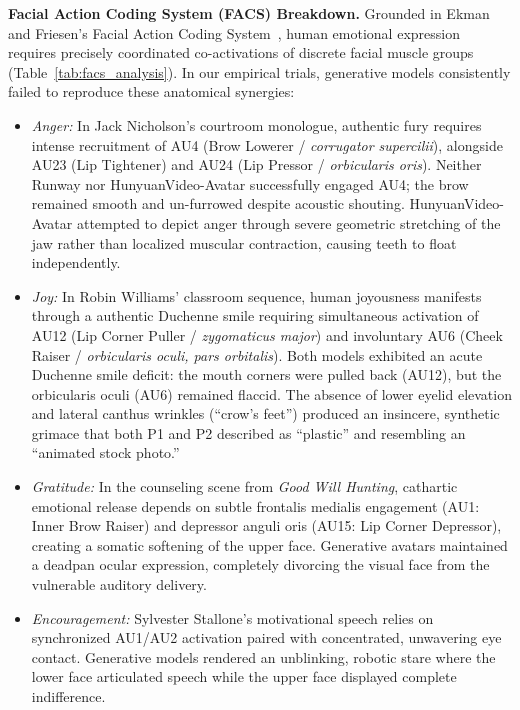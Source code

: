 \documentclass[pdflatex,sn-mathphys-num]{sn-jnl}
\newcommand{\emAnger}{Anger\xspace}
\newcommand{\emEncouragement}{Encouragement\xspace}
\newcommand{\emJoy}{Joy\xspace}
\newcommand{\emGratitude}{Gratitude\xspace}
\newcommand{\Pone}{\colorbox{gray!15}{P1}\xspace}
\newcommand{\Ptwo}{\colorbox{gray!30}{P2}\xspace}
\theoremstyle{thmstyleone}
\theoremstyle{thmstyletwo}
\theoremstyle{thmstylethree}
\begin{document}
\textbf{Facial Action Coding System (FACS) Breakdown.} Grounded in Ekman and Friesen's Facial Action Coding System~\cite{ekman1978facial}, human emotional expression requires precisely coordinated co-activations of discrete facial muscle groups (Table~\ref{tab:facs_analysis}). In our empirical trials, generative models consistently failed to reproduce these anatomical synergies:
\begin{itemize}
    \item \textit{\emAnger:} In Jack Nicholson's courtroom monologue, authentic fury requires intense recruitment of AU4 (Brow Lowerer / \textit{corrugator supercilii}), alongside AU23 (Lip Tightener) and AU24 (Lip Pressor / \textit{orbicularis oris}). Neither Runway nor HunyuanVideo-Avatar successfully engaged AU4; the brow remained smooth and un-furrowed despite acoustic shouting. HunyuanVideo-Avatar attempted to depict anger through severe geometric stretching of the jaw rather than localized muscular contraction, causing teeth to float independently.
    \item \textit{\emJoy:} In Robin Williams' classroom sequence, human joyousness manifests through a authentic Duchenne smile requiring simultaneous activation of AU12 (Lip Corner Puller / \textit{zygomaticus major}) and involuntary AU6 (Cheek Raiser / \textit{orbicularis oculi, pars orbitalis}). Both models exhibited an acute Duchenne smile deficit: the mouth corners were pulled back (AU12), but the orbicularis oculi (AU6) remained flaccid. The absence of lower eyelid elevation and lateral canthus wrinkles (``crow's feet'') produced an insincere, synthetic grimace that both \Pone and \Ptwo described as ``plastic'' and resembling an ``animated stock photo.''
    \item \textit{\emGratitude:} In the counseling scene from \textit{Good Will Hunting}, cathartic emotional release depends on subtle frontalis medialis engagement (AU1: Inner Brow Raiser) and depressor anguli oris (AU15: Lip Corner Depressor), creating a somatic softening of the upper face. Generative avatars maintained a deadpan ocular expression, completely divorcing the visual face from the vulnerable auditory delivery.
    \item \textit{\emEncouragement:} Sylvester Stallone's motivational speech relies on synchronized AU1/AU2 activation paired with concentrated, unwavering eye contact. Generative models rendered an unblinking, robotic stare where the lower face articulated speech while the upper face displayed complete indifference.
\end{itemize}
\end{document}
